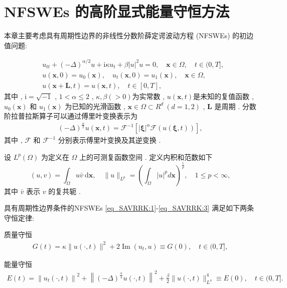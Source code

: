 \chapter[NFSWEs 的高阶显式能量守恒方法]{NFSWEs 的高阶显式能量守恒方法}

本章主要考虑具有周期性边界的非线性分数阶薛定谔波动方程 (NFSWEs) 的初边值问题:

\begin{align}
&  u_{t t}+(-\Delta)^{\alpha / 2} u+\mathrm{i} \kappa u_{t}+\beta|u|^{2} u=0 , \quad \boldsymbol{x} \in \Omega , \quad  t \in(0 , T] , \label{eq_SAVRRK:1}\\
& u(\boldsymbol{x} , 0)=u_{0}(\boldsymbol{x}) , \quad u_{t}(\boldsymbol{x} , 0)=u_{1}(\boldsymbol{x}) , \quad \boldsymbol{x} \in \Omega , \label{eq_SAVRRK:2}\\
& u(\boldsymbol{x}+\boldsymbol{L} , t)=u(\boldsymbol{x} , t) , \quad t \in[0 , T] , \label{eq_SAVRRK:3}
\end{align}
其中 , $\mathrm{i}=\sqrt{-1}$ , $1<\alpha \leq 2$ , $\kappa , \beta(>0)$为实常数 , $u(\boldsymbol{x} , t)$是未知的复值函数 , $u_{0}(\boldsymbol{x})$ 和 $u_{1}(\boldsymbol{x})$ 为已知的光滑函数 , $\boldsymbol{x}\in\Omega\!\subset\!
R^d~(d\!=\!1 , 2)$ , $\boldsymbol{L}$ 是周期 . 分数阶拉普拉斯算子可以通过傅里叶变换表示为
\begin{align}\label{eq_SAVRRK:4}
(-\Delta)^{\frac{\alpha}{2}} u(\boldsymbol{x} , t)=\mathcal{F}^{-1}\left[|\boldsymbol{\xi}|^{\alpha} \mathcal{F}(u(\boldsymbol{\xi} , t))\right] , 
\end{align}
其中 , $\mathcal{F}$ 和 $\mathcal{F}^{-1}$ 分别表示傅里叶变换及其逆变换 \cite{caffarelliExtensionProblemRelated2007} . 

设 $L^{p}(\Omega)$ 为定义在 $\Omega$ 上的可测复函数空间 . 定义内积和范数如下
\begin{equation}
(u , v)=\int_{\Omega} u \bar{v} \mathrm{~d} \boldsymbol{x} , \quad \|u\|_{L^{p}}=\left(\int_{\Omega}|u|^{p} d \boldsymbol{x}\right)^{\frac{1}{p}} , \quad 1 \leq p<\infty , 
\label{eq_6}
\end{equation}
其中 $\bar{v}$ 表示 $v$ 的复共轭 . 

\begin{theorem}
	具有周期性边界条件的NFSWEs \eqref{eq_SAVRRK:1}-\eqref{eq_SAVRRK:3} 满足如下两条守恒定律:

质量守恒
\begin{align}\label{eq_PAVF:_8}
    G(t)=\kappa\|u(\cdot , t)\|^{2}+2\operatorname{Im}\left(u_{t} , u\right) \equiv G(0) , \quad t \in(0 , T] , 
    \end{align}

能量守恒
\begin{align}\label{eq_SAVRRK:9}
	E(t)=\left\|u_{t}(\cdot , t)\right\|^{2}+\left\|(-\Delta)^{\frac{\alpha}{4}} u(\cdot , t)\right\|^{2}+\frac{\beta}{2}\|u(\cdot , t)\|_{L^{4}}^{4} \equiv E(0) , \quad t \in(0 , T] . 
	\end{align}
\end{theorem}

